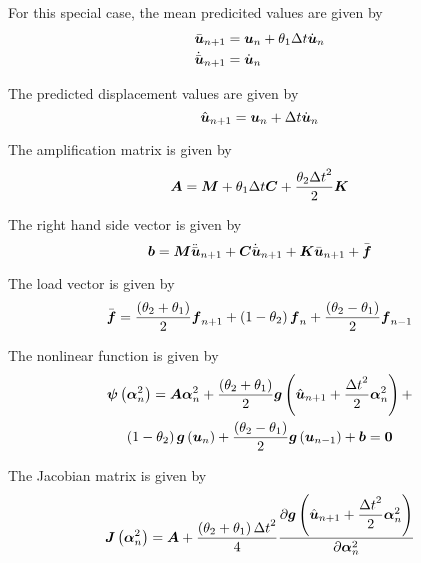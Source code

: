 For this special case, the mean predicited values are given by
\begin{equation}
  \begin{split}
    \bar{\boldsymbol{u}}_{n+1} &= \boldsymbol{u}_{n}+\theta_{1}\Delta t\dot{\boldsymbol{u}}_{n}\\
    \dot{\bar{\boldsymbol{u}}}_{n+1} &= \dot{\boldsymbol{u}}_{n}
  \end{split}
\end{equation}

The predicted displacement values are given by
\begin{equation}
   \hat{\boldsymbol{u}}_{n+1} = \boldsymbol{u}_{n}+\Delta t\dot{\boldsymbol{u}}_{n}
\end{equation}

The amplification matrix is given by
\begin{equation}
  \matr{A}=\matr{M}+\theta_{1}\Delta t\matr{C}+\dfrac{\theta_{2}{\Delta t}^{2}}{2}\matr{K}
\end{equation}

The right hand side vector is given by
\begin{equation}
  \vectr{b}=\matr{M}\ddot{\bar{\vectr{u}}}_{n+1}+\matr{C}\dot{\bar{\vectr{u}}}_{n+1}+\matr{K}\bar{\vectr{u}}_{n+1}+\bar{\vectr{f}}
\end{equation}

The load vector is given by
\begin{equation}
  \bar{\boldsymbol{f}}=\dfrac{\left( \theta_{2}+\theta_{1} \right)}{2}\boldsymbol{f}_{n+1}+\left( 1-\theta_{2} \right)\boldsymbol{f}_{n}
  +\dfrac{\left( \theta_{2}-\theta_{1} \right)}{2}\boldsymbol{f}_{n-1}
\end{equation}

The nonlinear function is given by
\begin{multline}
  \fnof{\vectr{\psi}}{\vectr{\alpha}^{2}_{n}}=\matr{A}\vectr{\alpha}^{2}_{n}+\dfrac{\pbrac{\theta_{2}+\theta_{1}}}{2}\fnof{\vectr{g}}{\hat{\vectr{u}}_{n+1}+
    \dfrac{{\Delta t}^{2}}{2}\vectr{\alpha}^{2}_{n}}+\\
  \pbrac{1-\theta_{2}}\fnof{\vectr{g}}{\vectr{u}_{n}}+\dfrac{\pbrac{\theta_{2}-\theta_{1}}}{2}\fnof{\vectr{g}}{\vectr{u}_{n-1}}+\vectr{b}=\vectr{0}
\end{multline}

The Jacobian matrix is given by
\begin{equation}
  \fnof{\matr{J}}{\vectr{\alpha}^{2}_{n}}=\matr{A}+\dfrac{\pbrac{\theta_{2}+\theta_{1}}{\Delta t}^{2}}{4}
  \delby{\fnof{\vectr{g}}{\hat{\vectr{u}}_{n+1}+\dfrac{{\Delta t}^{2}}{2}\vectr{\alpha}^{2}_{n}}}{\vectr{\alpha}^{2}_{n}}
\end{equation}

